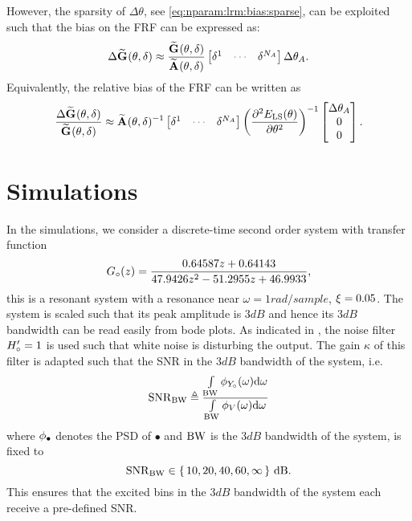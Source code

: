 However, the sparsity of $\Delta\theta$, see \eqref{eq:nparam:lrm:bias:sparse}, can be exploited such that the bias on the \gls{FRF} can be expressed as:
\begin{equation}
  \Delta \LocalModel{G}(\theta,\dW)
  \approx
  \frac{\LocalModel{G}(\theta, \dW)}
           {\LocalModel{A}(\theta, \dW)}
  \begin{bmatrix}
    \dW^1 & \deemph{\cdots} & \dW^{\order{A}}
  \end{bmatrix}
  \Delta \theta_A
  \text{.}
\end{equation}
Equivalently, the relative bias of the \gls{FRF} can be written as
\begin{equation}
\frac{\Delta \LocalModel{G}(\theta,\dW)}{\LocalModel{G}(\theta,\dW)}
\approx
\LocalModel{A}(\theta,\dW)^{-1}
\begin{bmatrix}
    \dW^1 & \deemph{\cdots} & \dW^{\order{A}}
  \end{bmatrix}
  \left(  \PartialDerivative[2]{\ELSCost{\theta}}{ \theta^2 } \right)^{-1}
  \begin{bmatrix}
  \Delta\theta_A\\
  0\\
  0\\
  \end{bmatrix}
  \text{.}
\end{equation}


\section{Simulations}
\label{sec:simulations}

In the simulations, we consider a discrete-time second order system with transfer function
\begin{equation}
{G}_{\circ}(z) = \frac{0.64587 z + 0.64143}
                                      {47.9426 z^2 - 51.2955 z + 46.9933}
                                      \text{,}
\end{equation}
this is a resonant system with a resonance near $\omega=1\unit{rad/sample}$, $\xi_{}=0.05$.
The system is scaled such that its peak amplitude is $3\unit{dB}$ and hence its $3\unit{dB}$ bandwidth can be read easily from bode plots.
As indicated in , the noise filter ${H}_{\circ}' = 1$ is used such that white noise is disturbing the output.
The gain $\kappa$ of this filter is adapted such that the \gls{SNR} in the $3\unit{dB}$ bandwidth of the system, i.e.
\begin{equation}
  \mathrm{SNR}_{\mathrm{BW}} \triangleq
  \frac{\int\limits_{\mathrm{BW}} \phi_{{Y}_{\circ}}(\omega) \mathrm{d}\omega}
            {\int\limits_{\mathrm{BW}} \phi_{V}(\omega) \mathrm{d}{\omega}}
\end{equation}
where $\phi_{\bullet}$ denotes the \gls{PSD} of $\bullet$ and $\mathrm{BW}$ is the $3 \unit{dB}$ bandwidth of the system, is fixed to \[
\mathrm{SNR}_{\mathrm{BW}} \in \set{10, 20, 40, 60, \infty} \,\mathrm{dB}\text{.}
\]
This ensures that the excited bins in the $3\unit{dB}$ bandwidth of the system each receive a pre-defined \gls{SNR}.

